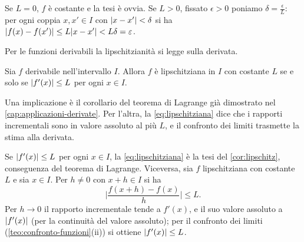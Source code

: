 \begin{dimostrazione}
Se $L=0$, $f$ è costante e la tesi è ovvia. Se $L>0$, fissato $\epsilon>0$ poniamo
$\delta=\frac\epsilon L$: per ogni coppia $x,x'\in I$ con $\lvert x-x'\rvert<\delta$ si ha
$\lvert f(x)-f(x')\rvert\le L\lvert x-x'\rvert<L\delta=\varepsilon$.
\end{dimostrazione}

Per le funzioni derivabili la lipschitzianità si legge sulla derivata.

\begin{teorema}\label{teo:lipschitz-derivata}
Sia $f$ derivabile nell'intervallo $I$. Allora $f$ è lipschitziana in $I$ con costante
$L$ se e solo se $\lvert f'(x)\rvert\le L$ per ogni $x\in I$.
\end{teorema}

\begin{schema}
\end{schema}

\begin{strategia}
Una implicazione è il corollario del teorema di Lagrange già dimostrato nel
\cref{cap:applicazioni-derivate}. Per l'altra, la \eqref{eq:lipschitziana} dice che i
rapporti incrementali sono in valore assoluto al più $L$, e il confronto dei limiti
trasmette la stima alla derivata.
\end{strategia}

\begin{dimostrazione}
Se $\lvert f'(x)\rvert\le L$ per ogni $x\in I$, la \eqref{eq:lipschitziana} è la tesi del
\cref{cor:lipschitz}, conseguenza del teorema di Lagrange. Viceversa, sia $f$
lipschitziana con costante $L$ e sia $x\in I$. Per $h\neq0$ con $x+h\in I$ si ha
\[
  \biggl|\frac{f(x+h)-f(x)}h\biggr|\le L .
\]
Per $h\to0$ il rapporto incrementale tende a $f'(x)$, e il suo valore assoluto a
$\lvert f'(x)\rvert$ (per la continuità del valore assoluto); per il confronto dei limiti
(\cref{teo:confronto-funzioni}(ii)) si ottiene $\lvert f'(x)\rvert\le L$.
\end{dimostrazione}

